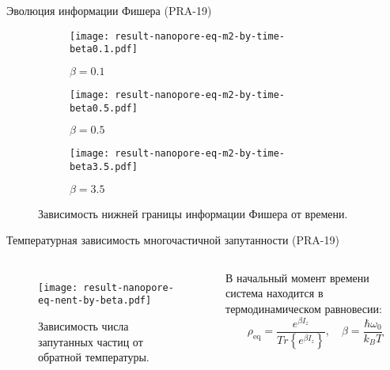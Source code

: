 \begin{frame}{Эволюция информации Фишера (PRA-19)}
  \begin{figure}
    \begin{subfigure}[t]{0.3\textwidth}
      \texttt{[image: result-nanopore-eq-m2-by-time-beta0.1.pdf]}
      \caption{$\beta = 0.1$}
    \end{subfigure}
    \begin{subfigure}[t]{0.3\textwidth}
      \texttt{[image: result-nanopore-eq-m2-by-time-beta0.5.pdf]}
      \caption{$\beta = 0.5$}
    \end{subfigure}
    \begin{subfigure}[t]{0.3\textwidth}
      \texttt{[image: result-nanopore-eq-m2-by-time-beta3.5.pdf]}
      \caption{$\beta = 3.5$}
    \end{subfigure}
    \caption{Зависимость нижней границы информации Фишера от времени.}
  \end{figure}
\end{frame}


\begin{frame}{Температурная зависимость многочастичной запутанности (PRA-19)}
\begin{columns}
    \begin{figure}
    \texttt{[image: result-nanopore-eq-nent-by-beta.pdf]}
    \caption{Зависимость числа запутанных частиц от обратной температуры.}
    \end{figure}


    В начальный момент времени система находится в термодинамическом равновесии:
    $$
    \rho_\mathrm{eq} = \dfrac{ e^{\beta I_z} }{Tr \left\{ e^{\beta I_z} \right\} },
    \quad
    \beta = \dfrac{\hbar \omega_0}{k_{B} T}
    $$
\end{columns}
\end{frame}


